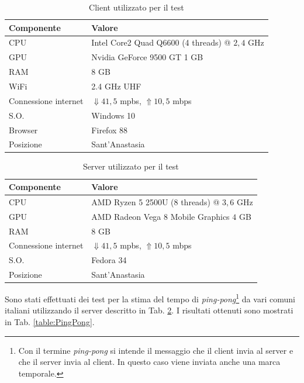 \begin{table}[H]
	\centering
	\begin{tabular}{||l l||}
		\hline
		Componente & Valore \\
		\hline\hline				
		\hline
		CPU & Intel Core2 Quad Q6600 (4 threads) @ $2,4$ GHz \\
		\hline
		GPU & Nvidia GeForce 9500 GT 1 GB\\
		\hline
		RAM & 8 GB \\
		\hline		
		WiFi & 2.4 GHz UHF \\
		\hline		
		Connessione internet & $\Downarrow 41,5$ mpbs, $\Uparrow 10,5$ mbps \\
		\hline
		S.O. & Windows 10 \\
		\hline
		Browser & Firefox 88 \\
		\hline
		Posizione & Sant'Anastasia \\
		\hline
	\end{tabular}

	\caption{Client utilizzato per il test}
	\label{table:ClientUsato}
\end{table}

\begin{table}[H]
	\centering
	\begin{tabular}{||l l||}
		\hline
		Componente & Valore \\
		\hline\hline				
		\hline
		CPU & AMD Ryzen 5 2500U (8 threads) @ $3,6$ GHz \\
		\hline
		GPU & AMD Radeon Vega 8 Mobile Graphics $4$ GB \\
		\hline
		RAM & 8 GB \\
		\hline
		Connessione internet & $\Downarrow 41,5$ mpbs, $\Uparrow 10,5$ mbps \\
		\hline
		S.O. & Fedora 34 \\
		\hline
		Posizione & Sant'Anastasia \\
		\hline
	\end{tabular}

	\caption{Server utilizzato per il test}
	\label{table:ServerUsato}
\end{table}


Sono stati effettuati dei test per la stima del tempo di \textit{ping-pong}\footnote{Con il termine \textit{ping-pong} si intende il messaggio che il client invia al server e che il server invia al client. In questo caso viene inviata anche una marca temporale.} da vari comuni italiani utilizzando il server descritto in Tab. \ref{table:ServerUsato}. I risultati ottenuti sono mostrati in Tab. \ref{table:PingPong}.

